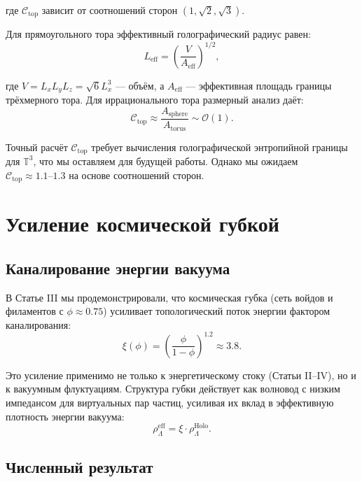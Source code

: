 \documentclass[12pt,a4paper]{article}
\begin{document}
где $\mathcal{C}_{\mathrm{top}}$ зависит от соотношений сторон $(1, \sqrt{2}, \sqrt{3})$.

Для прямоугольного тора эффективный голографический радиус равен:
\begin{equation}
L_{\mathrm{eff}} = \left(\frac{V}{A_{\mathrm{eff}}}\right)^{1/2},
\end{equation}

где $V = L_x L_y L_z = \sqrt{6} L_x^3$ — объём, а $A_{\mathrm{eff}}$ — эффективная площадь границы трёхмерного тора. Для иррационального тора размерный анализ даёт:
\begin{equation}
\mathcal{C}_{\mathrm{top}} \approx \frac{A_{\mathrm{sphere}}}{A_{\mathrm{torus}}} \sim \mathcal{O}(1).
\end{equation}

Точный расчёт $\mathcal{C}_{\mathrm{top}}$ требует вычисления голографической энтропийной границы для $\mathbb{T}^3$, что мы оставляем для будущей работы. Однако мы ожидаем $\mathcal{C}_{\mathrm{top}} \approx 1.1\text{--}1.3$ на основе соотношений сторон.

\section{Усиление космической губкой}

\subsection{Каналирование энергии вакуума}

В Статье III мы продемонстрировали, что космическая губка (сеть войдов и филаментов с $\phi \approx 0.75$) усиливает топологический поток энергии фактором каналирования:
\begin{equation}
\xi(\phi) = \left(\frac{\phi}{1-\phi}\right)^{1.2} \approx 3.8.
\end{equation}

Это усиление применимо не только к энергетическому стоку (Статьи II--IV), но и к вакуумным флуктуациям. Структура губки действует как волновод с низким импедансом для виртуальных пар частиц, усиливая их вклад в эффективную плотность энергии вакуума:
\begin{equation}
\rho_{\Lambda}^{\mathrm{eff}} = \xi \cdot \rho_{\Lambda}^{\mathrm{Holo}}.
\end{equation}

\subsection{Численный результат}
\end{document}
